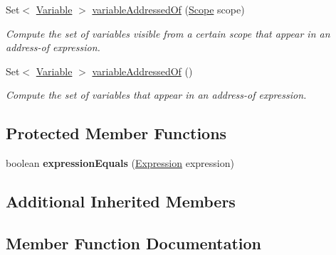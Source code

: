 \begin{DoxyCompactItemize}
\item 
Set$<$ \hyperlink{interfaceedu_1_1udel_1_1cis_1_1vsl_1_1civl_1_1model_1_1IF_1_1variable_1_1Variable}{Variable} $>$ \hyperlink{classedu_1_1udel_1_1cis_1_1vsl_1_1civl_1_1model_1_1common_1_1expression_1_1CommonSizeofTypeExpression_a17689e29979489f5cc3ba6df825a9669}{variable\+Addressed\+Of} (\hyperlink{interfaceedu_1_1udel_1_1cis_1_1vsl_1_1civl_1_1model_1_1IF_1_1Scope}{Scope} scope)
\begin{DoxyCompactList}\small\item\em Compute the set of variables visible from a certain scope that appear in an address-\/of expression. \end{DoxyCompactList}\item 
Set$<$ \hyperlink{interfaceedu_1_1udel_1_1cis_1_1vsl_1_1civl_1_1model_1_1IF_1_1variable_1_1Variable}{Variable} $>$ \hyperlink{classedu_1_1udel_1_1cis_1_1vsl_1_1civl_1_1model_1_1common_1_1expression_1_1CommonSizeofTypeExpression_a008bc274c4c1da5b25ae17022ffecd46}{variable\+Addressed\+Of} ()
\begin{DoxyCompactList}\small\item\em Compute the set of variables that appear in an address-\/of expression. \end{DoxyCompactList}\end{DoxyCompactItemize}
\subsection*{Protected Member Functions}
\begin{DoxyCompactItemize}
\item 
\hypertarget{classedu_1_1udel_1_1cis_1_1vsl_1_1civl_1_1model_1_1common_1_1expression_1_1CommonSizeofTypeExpression_af5f92356c854844712d28db5fd53e409}{}boolean {\bfseries expression\+Equals} (\hyperlink{interfaceedu_1_1udel_1_1cis_1_1vsl_1_1civl_1_1model_1_1IF_1_1expression_1_1Expression}{Expression} expression)\label{classedu_1_1udel_1_1cis_1_1vsl_1_1civl_1_1model_1_1common_1_1expression_1_1CommonSizeofTypeExpression_af5f92356c854844712d28db5fd53e409}

\end{DoxyCompactItemize}
\subsection*{Additional Inherited Members}


\subsection{Member Function Documentation}
\hypertarget{classedu_1_1udel_1_1cis_1_1vsl_1_1civl_1_1model_1_1common_1_1expression_1_1CommonSizeofTypeExpression_a65d4b219cccf5d54d12f0286520b153d}{}
